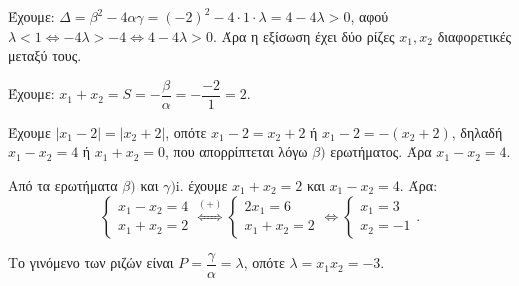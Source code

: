 
\begin{alist}
\item Έχουμε:
$\Delta = \beta^2 - 4\alpha\gamma = (-2)^2 - 4 \cdot 1 \cdot \lambda = 4 - 4\lambda > 0$, αφού $\lambda < 1 \Leftrightarrow -4\lambda > -4 \Leftrightarrow 4 - 4\lambda > 0$. Άρα η
εξίσωση έχει δύο ρίζες $x_1, x_2$ διαφορετικές μεταξύ τους.

\item Έχουμε: $x_1 + x_2 = S = -\dfrac{\beta}{\alpha} = -\dfrac{-2}{1} = 2$.

\item 
\begin{rlist}
\item Έχουμε $|x_1 - 2| = |x_2 + 2|$, οπότε
$x_1 - 2 = x_2 + 2$ ή $x_1 - 2 = -(x_2 + 2)$, δηλαδή
$x_1 - x_2 = 4$ ή $x_1 + x_2 = 0$, που απορρίπτεται λόγω $\beta)$ ερωτήματος.
Άρα $x_1 - x_2 = 4$.

\item Από τα ερωτήματα $\beta)$ και $\gamma)$i. έχουμε $x_1 + x_2 = 2$ και $x_1 - x_2 = 4$. Άρα:
\[\begin{cases} x_1 - x_2 = 4 \\ x_1 + x_2 = 2 \end{cases} \stackrel{(+)}{\Leftrightarrow} \begin{cases} 2x_1 = 6 \\ x_1 + x_2 = 2 \end{cases} \Leftrightarrow \begin{cases} x_1 = 3 \\ x_2 = -1 \end{cases}.\]

Το γινόμενο των ριζών είναι $P = \dfrac{\gamma}{\alpha} = \lambda$, οπότε $\lambda = x_1 x_2 = -3$.
\end{rlist}
\end{alist}

